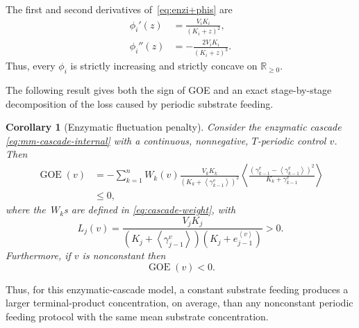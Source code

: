 \documentclass[onecolumn]{IEEEtran}
\newcommand{\R}{\mathbb{R}}
\newcommand{\GOE}{\operatorname{GOE}}
\newcommand{\avg}[1]{\left\langle #1\right\rangle}
\newtheorem{corollary}[theorem]{Corollary}
\begin{document}
 

 

 
The first and second derivatives of~\eqref{eq:enzi+phis} are
\begin{align*}
    \phi_i'(z)
    &=
    \frac{V_iK_i}{(K_i+z)^2},
    \\
    \phi_i''(z)
    &=
    -\frac{2V_iK_i}{(K_i+z)^3}.
\end{align*}
Thus, every $\phi_i$ is strictly increasing and strictly concave on
$\R_{\geq0}$.
   
The following result gives both the sign of GOE and an exact stage-by-stage
decomposition of the loss caused by periodic substrate feeding.

\begin{corollary}[Enzymatic fluctuation penalty]
\label{prop:mm-fluctuation-penalty}
Consider the enzymatic cascade
\eqref{eq:mm-cascade-internal} with a continuous,
nonnegative, $T$-periodic control $v$. Then
\begin{align}\label{eq:mm-exact-goe}
    \GOE(v)
  &  =
    -
    \sum_{k=1}^n
    W_k(v)
    \frac{V_k K_k}{(K_k+ \avg{ \gamma_{k-1}^v})^2}
    \avg{
    \frac{( \gamma_{k-1}^v-\avg{ \gamma_{k-1}^v} )^2}{K_k+ \gamma_{k-1}^v}
    } \\
    &\leq 0\nonumber  ,     
\end{align}
where the~$W_k$s are defined in 
\eqref{eq:cascade-weight},
with 
\begin{equation*}
    L_j(v)
    =
    \frac{V_jK_j}
    {
    (K_j+\avg{\gamma_{j-1}^v})
    (K_j+e_{j-1}^{\avg v})
    }
    >0.
    \label{eq:mm-secant-gain}
\end{equation*}
Furthermore, if $v$ is nonconstant then
\begin{equation}
    \GOE(v)<0.
    \label{eq:mm-goe-strict}
\end{equation}
\end{corollary}


Thus, for this  enzymatic-cascade model, a constant  substrate
feeding produces a larger terminal-product concentration, on average, than
any nonconstant periodic feeding protocol with the same mean substrate concentration.
\end{document}
